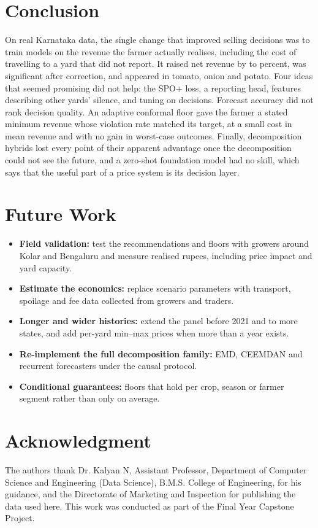 \documentclass{ieeeaccess}
\begin{document}
\section{Conclusion}
\label{sec:conclusion}
On real Karnataka data, the single change that improved selling decisions was to train models on the revenue the farmer actually realises, including the cost of travelling to a yard that did not report. It raised net revenue by \PctGainLo{} to \PctGainHi{} percent, was significant after correction, and appeared in tomato, onion and potato. Four ideas that seemed promising did not help: the SPO+ loss, a reporting head, features describing other yards' silence, and tuning on decisions. Forecast accuracy did not rank decision quality. An adaptive conformal floor gave the farmer a stated minimum revenue whose violation rate matched its target, at a small cost in mean revenue and with no gain in worst-case outcomes. Finally, decomposition hybrids lost every point of their apparent advantage once the decomposition could not see the future, and a zero-shot foundation model had no skill, which says that the useful part of a price system is its decision layer.

\section{Future Work}
\begin{itemize}
\item \textbf{Field validation:} test the recommendations and floors with growers around Kolar and Bengaluru and measure realised rupees, including price impact and yard capacity.
\item \textbf{Estimate the economics:} replace scenario parameters with transport, spoilage and fee data collected from growers and traders.
\item \textbf{Longer and wider histories:} extend the panel before 2021 and to more states, and add per-yard min--max prices when more than a year exists.
\item \textbf{Re-implement the full decomposition family:} EMD, CEEMDAN and recurrent forecasters under the causal protocol.
\item \textbf{Conditional guarantees:} floors that hold per crop, season or farmer segment rather than only on average.
\end{itemize}

\section*{Acknowledgment}
The authors thank Dr. Kalyan N, Assistant Professor, Department of Computer Science and Engineering (Data Science), B.M.S. College of Engineering, for his guidance, and the Directorate of Marketing and Inspection for publishing the data used here. This work was conducted as part of the Final Year Capstone Project.
\end{document}
